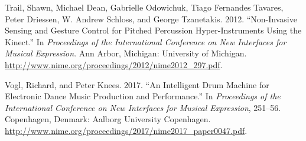 \documentclass{nime-alternate} %
\newlength{\cslhangindent}
\newenvironment{cslreferences}%
  {\setlength{\parindent}{0pt}%
  \everypar{\setlength{\hangindent}{\cslhangindent}}\ignorespaces}%
  {\par}
\begin{document}
\begin{cslreferences}
\leavevmode\hypertarget{ref-Trail:2012a}{}%
Trail, Shawn, Michael Dean, Gabrielle Odowichuk, Tiago Fernandes
Tavares, Peter Driessen, W. Andrew Schloss, and George Tzanetakis. 2012.
``Non-Invasive Sensing and Gesture Control for Pitched Percussion
Hyper-Instruments Using the Kinect.'' In \emph{Proceedings of the
International Conference on New Interfaces for Musical Expression}. Ann
Arbor, Michigan: University of Michigan.
\url{http://www.nime.org/proceedings/2012/nime2012_297.pdf}.

\leavevmode\hypertarget{ref-rvogl2017}{}%
Vogl, Richard, and Peter Knees. 2017. ``An Intelligent Drum Machine for
Electronic Dance Music Production and Performance.'' In
\emph{Proceedings of the International Conference on New Interfaces for
Musical Expression}, 251--56. Copenhagen, Denmark: Aalborg University
Copenhagen.
\url{http://www.nime.org/proceedings/2017/nime2017_paper0047.pdf}.
\end{cslreferences}
\end{document}
